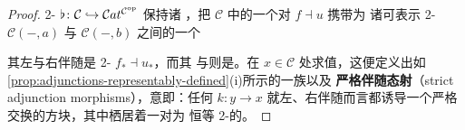 \begin{proof}
\trYonedaEmbedding{} 2-\trFunctor{}
$\flat\colon\mathcal{C}\hookrightarrow\mathcal{C}at^{\mathcal{C}^{\mathrm{op}}}$ 保持诸%
\trAdjunction，把 $\mathcal{C}$ 中的一个\trAdjunction{}对 $f\dashv u$ 携带为
诸可表示 2-\trFunctor{} $\mathcal{C}(-,a)$ 与 $\mathcal{C}(-,b)$ 之间的一个%
\trAdjunction
\begin{center}
\end{center}
其左与右伴随是 2-\trNaturalTransformation{} $f_{\ast}\dashv u_{\ast}$，而其%
\trUnit{}与\trCounit{}则是\trModification{}。在 $x\in\mathcal{C}$ 处求值，这便定义出如%
\cref{prop:adjunctions-representably-defined}(i)所示的一族\trAdjunction{}以及%
\textbf{严格伴随态射}（strict adjunction morphisms），意即：任何
$k\colon y\to x$ 就左、右伴随而言都诱导一个严格交换的方块，其中栖居着一对为
恒等 2-\trCell{}的\trMate{}。


\end{proof}

